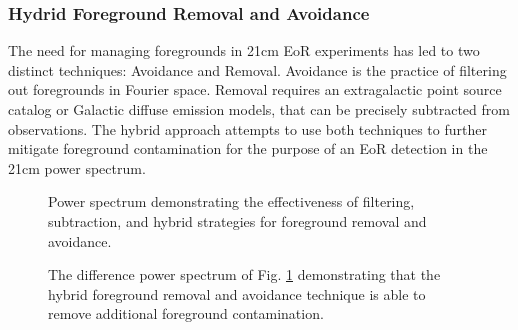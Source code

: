 \documentclass[a0,landscape]{a0poster}
\begin{document}
\begin{multicols}{4}
\subsubsection*{Hydrid Foreground Removal and Avoidance}
The need for managing foregrounds in 21cm EoR experiments has led to two distinct techniques: Avoidance and Removal. Avoidance is the practice of filtering out foregrounds in Fourier space. Removal requires an extragalactic point source catalog or Galactic diffuse emission models, that can be precisely subtracted from observations. The hybrid approach attempts to use both techniques to further mitigate foreground contamination for the purpose of an EoR detection in the 21cm power spectrum.

\begin{figure}[H]
\centering
{}
\caption{Power spectrum demonstrating the effectiveness of filtering, subtraction, and hybrid strategies for foreground removal and avoidance.}
\label{fig:stages}
\end{figure}

\begin{figure}[H]
\centering
{}
\caption{The difference power spectrum of Fig. \ref{fig:stages} demonstrating that the hybrid foreground removal and avoidance technique is able to remove 
additional foreground contamination.}
\label{fig:diffmid}
\end{figure}


\end{multicols}
\end{document}
